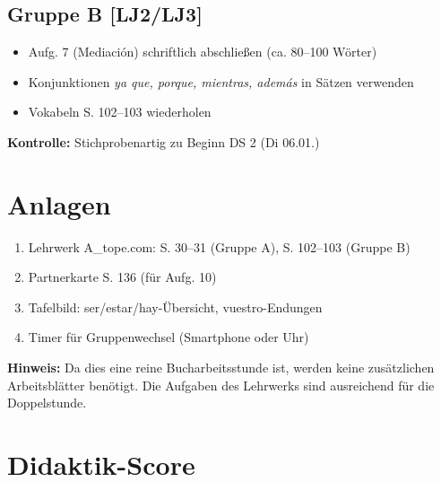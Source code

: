 \documentclass[11pt,a4paper]{article}
\begin{document}
\subsection{Gruppe B [LJ2/LJ3]}
\begin{itemize}
    \item Aufg. 7 (Mediación) schriftlich abschließen (ca. 80--100 Wörter)
    \item Konjunktionen \textit{ya que, porque, mientras, además} in Sätzen verwenden
    \item Vokabeln S. 102--103 wiederholen
\end{itemize}

\textbf{Kontrolle:} Stichprobenartig zu Beginn DS 2 (Di 06.01.)

\section{Anlagen}

\begin{enumerate}
    \item Lehrwerk A\_tope.com: S. 30--31 (Gruppe A), S. 102--103 (Gruppe B)
    \item Partnerkarte S. 136 (für Aufg. 10)
    \item Tafelbild: ser/estar/hay-Übersicht, vuestro-Endungen
    \item Timer für Gruppenwechsel (Smartphone oder Uhr)
\end{enumerate}

\textbf{Hinweis:} Da dies eine reine Bucharbeitsstunde ist, werden keine zusätzlichen Arbeitsblätter benötigt. Die Aufgaben des Lehrwerks sind ausreichend für die Doppelstunde.

\newpage
\section{Didaktik-Score}
\end{document}
